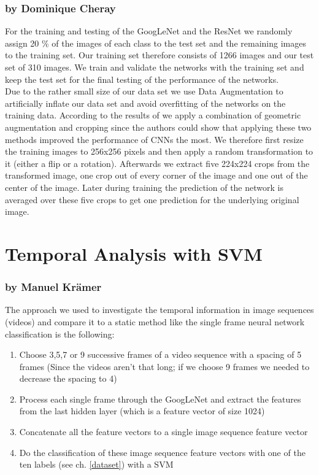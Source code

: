 \documentclass[11pt]{report}
\begin{document}
\subsubsection{by Dominique Cheray}
For the training and testing of the GoogLeNet and the ResNet we randomly
assign 20 \% of the images of each class to the test set and the remaining
images to the training set. Our training set therefore consists of 1266 images
and our test set of 310 images. We train and validate the networks with the
training set and keep the test set for the final testing of the performance
of the networks. \\
Due to the rather small size of our data set we use Data Augmentation to
artificially inflate our data set and avoid overfitting of the networks on the
training data. According to the results of \cite{taylor2017imporving} we apply
a combination of geometric augmentation and cropping since the authors could
show that applying these two methods improved the performance of CNNs
the most. We therefore first resize the training images to 256x256 pixels and
then apply a random transformation to it (either a flip or a rotation).
Afterwards we extract five 224x224 crops from the transformed image, one crop
out of every corner of the image and one out of the center of the image. Later
during training the prediction of the network is averaged over these five crops
to get one prediction for the underlying original image. \\


\section{Temporal Analysis with SVM}
\subsubsection{by Manuel Krämer}
The approach we used to investigate the temporal information in image sequences (videos) and compare it to a static method like the single frame neural network classification is the following:

\begin{enumerate} 
\item Choose 3,5,7 or 9 successive frames of a video sequence with a spacing of 5 frames (Since the videos aren't that long; if we choose 9 frames we needed to decrease the spacing to 4)
\item Process each single frame through the GoogLeNet and extract the features from the last hidden layer (which is a feature vector of size 1024)
\item Concatenate all the feature vectors to a single image sequence feature vector
\item Do the classification of these image sequence feature vectors with one of the ten labels (see ch. \ref{dataset}) with a SVM
\end{enumerate}
\end{document}
